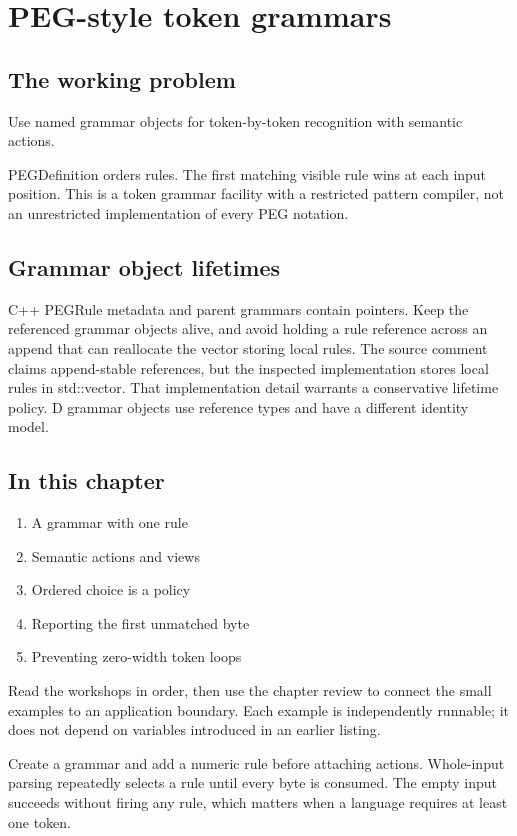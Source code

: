 \chapter{PEG-style token grammars}\label{ch:6}
\section*{The working problem}
Use named grammar objects for token-by-token recognition with semantic actions.

PEGDefinition orders rules. The first matching visible rule wins at each input position. This is a token grammar facility with a restricted pattern compiler, not an unrestricted implementation of every PEG notation.

\section*{Grammar object lifetimes}
C++ PEGRule metadata and parent grammars contain pointers. Keep the referenced grammar objects alive, and avoid holding a rule reference across an append that can reallocate the vector storing local rules. The source comment claims append-stable references, but the inspected implementation stores local rules in std::vector. That implementation detail warrants a conservative lifetime policy. D grammar objects use reference types and have a different identity model.

\section*{In this chapter}
\begin{enumerate}
\item A grammar with one rule
\item Semantic actions and views
\item Ordered choice is a policy
\item Reporting the first unmatched byte
\item Preventing zero-width token loops
\end{enumerate}
Read the workshops in order, then use the chapter review to connect the small examples to an application boundary. Each example is independently runnable; it does not depend on variables introduced in an earlier listing.

\clearpage
{}
Create a grammar and add a numeric rule before attaching actions. Whole-input parsing repeatedly selects a rule until every byte is consumed. The empty input succeeds without firing any rule, which matters when a language requires at least one token.

